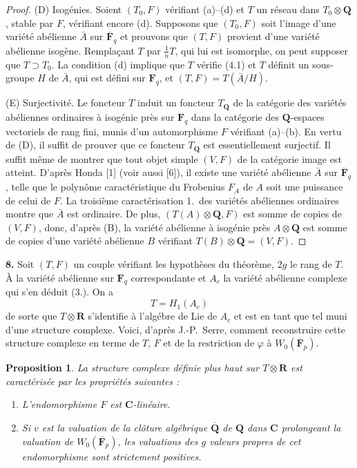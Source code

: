 \documentclass[10pt]{amsart}
\theoremstyle{plain}
\newtheorem{proposition}[theorem]{Proposition}
\theoremstyle{remark}
\begin{document}
\begin{proof}
(D) Isog\'enies. Soient $(T_0, F)$ v\'erifiant (a)--(d) et $T$ un
r\'eseau dans $T_0 \otimes \mathbf{Q}$, stable par $F$, v\'erifiant
encore (d). Supposons que $(T_0, F)$ soit l'image d'une vari\'et\'e
ab\'elienne $\bar{A}$ sur $\overline{\mathbf{F}}_q$ et prouvons que
$(T, F)$ provient d'une vari\'et\'e ab\'elienne isog\`ene. Rempla\c{c}ant
$T$ par $\frac{1}{n}T$, qui lui est isomorphe, on peut supposer que
$T \supset T_0$. La condition (d) implique que $T$ v\'erifie (4.1) et
$T$ d\'efinit un sous-groupe $H$ de $\bar{A}$, qui est d\'efini sur
$\mathbf{F}_q$, et $(T, F) = T(\bar{A}/H)$.

(E) Surjectivit\'e. Le foncteur $T$ induit un foncteur $T_{\mathbf{Q}}$
de la cat\'egorie des vari\'et\'es ab\'eliennes ordinaires \`a isog\'enie
pr\`es sur $\mathbf{F}_q$ dans la cat\'egorie des $\mathbf{Q}$-espaces
vectoriels de rang fini, munis d'un automorphisme $F$ v\'erifiant
(a)--(b). En vertu de (D), il suffit de prouver que ce foncteur
$T_{\mathbf{Q}}$ est essentiellement surjectif. Il suffit m\^eme de
montrer que tout objet simple $(V, F)$ de la cat\'egorie image est
atteint. D'apr\`es Honda [1] (voir aussi [6]), il existe une vari\'et\'e
ab\'elienne $\bar{A}$ sur $\overline{\mathbf{F}}_q$, telle que le polyn\^ome
caract\'eristique du Frobenius $F_A$ de $A$ soit une puissance de celui
de $F$. La troisi\`eme caract\'erisation 1.\ des vari\'et\'es ab\'eliennes
ordinaires montre que $\bar{A}$ est ordinaire. De plus,
$(T(A) \otimes \mathbf{Q}, F)$ est somme de copies de $(V, F)$, donc,
d'apr\`es (B), la vari\'et\'e ab\'elienne \`a isog\'enie pr\`es
$A \otimes \mathbf{Q}$ est somme de copies d'une vari\'et\'e ab\'elienne
$B$ v\'erifiant $T(B) \otimes \mathbf{Q} = (V, F)$.
\end{proof}

\smallskip
\textbf{8.} Soit $(T, F)$ un couple v\'erifiant les hypoth\`eses du
th\'eor\`eme, $2g$ le rang de $T$. \`A la vari\'et\'e ab\'elienne
sur $\mathbf{F}_q$ correspondante et $A_c$ la vari\'et\'e ab\'elienne
complexe qui s'en d\'eduit (3.). On a
\[
T = H_1(A_c)
\]
de sorte que $T \otimes \mathbf{R}$ s'identifie \`a l'alg\'ebre de Lie de
$A_c$ et est en tant que tel muni d'une structure complexe. Voici,
d'apr\`es J.-P.\ Serre, comment reconstruire cette structure complexe
en terme de $T$, $F$ et de la restriction de $\varphi$ \`a
$W_0(\overline{\mathbf{F}}_p)$.

\begin{proposition}
La structure complexe d\'efinie plus haut sur $T \otimes \mathbf{R}$ est
caract\'eris\'ee par les propri\'et\'es suivantes :
\begin{enumerate}
\item[(I)] L'endomorphisme $F$ est $\mathbf{C}$-lin\'eaire.
\item[(II)] Si $v$ est la valuation de la cl\^oture alg\'ebrique
$\overline{\mathbf{Q}}$ de $\mathbf{Q}$ dans $\mathbf{C}$ prolongeant la
valuation de $W_0(\overline{\mathbf{F}}_p)$, les valuations des $g$
valeurs propres de cet endomorphisme sont strictement positives.
\end{enumerate}
\end{proposition}
\end{document}
